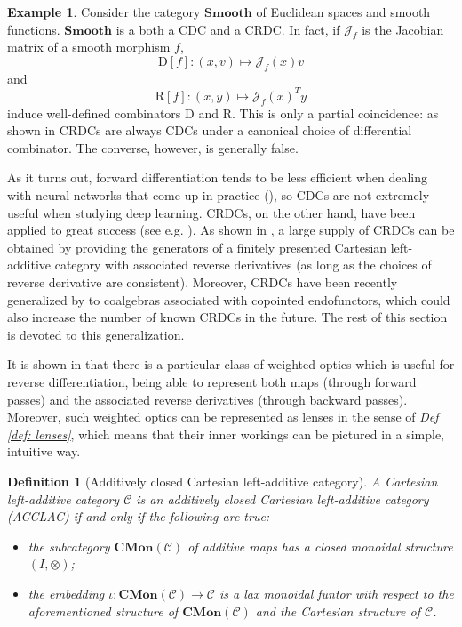 \documentclass[11pt,a4paper,openright,twoside]{report}
\newcounter{mycounter}
\theoremstyle{plain}
\newtheorem{definition}[mycounter]{Definition}
\theoremstyle{definition}
\newtheorem{example}[mycounter]{Example}
\begin{document}
\begin{example}
  \label{ex: smooth}
  Consider the category $\mathbf{Smooth}$ of Euclidean spaces and smooth functions.
  $\mathbf{Smooth}$ is a both a CDC and a CRDC. In fact, if $\mathcal{J}_f$ is the Jacobian matrix of a smooth morphism $f$,
  \[\mathrm{D}[f]: (x,v) \mapsto \mathcal{J}_f(x)v\]
  and
  \[\mathrm{R}[f]: (x,y) \mapsto \mathcal{J}_f(x)^Ty\]
  induce well-defined combinators $\mathrm{D}$ and $\mathrm{R}$. This is only a partial coincidence: as shown in \cite{cockett2019reverse} CRDCs are always CDCs under a canonical choice of differential combinator. The converse, however, is generally false.
\end{example}

As it turns out, forward differentiation tends to be less efficient when dealing with neural networks that come up in practice (\cite{elliott2018simple}), so CDCs are not extremely useful when studying deep learning. CRDCs, on the other hand, have been applied to great success (see e.g. \cite{cruttwell2022categorical}). As shown in \cite{wilson2022categories}, a large supply of CRDCs can be obtained by providing the generators of a finitely presented Cartesian left-additive category with associated reverse derivatives (as long as the choices of reverse derivative are consistent).
Moreover, CRDCs have been recently generalized by \cite{gavranovic2024fundamental} to coalgebras associated with copointed endofunctors, which could also increase the number of known CRDCs in the future. The rest of this section is devoted to this generalization.

It is shown in \cite{gavranovic2024fundamental} that there is a particular class of weighted optics which is useful for reverse differentiation, being able to represent both maps (through forward passes) and the associated reverse derivatives (through backward passes). Moreover, such weighted optics can be represented as lenses in the sense of \textit{Def \ref{def: lenses}}, which means that their inner workings can be pictured in a simple, intuitive way.

\begin{definition}[Additively closed Cartesian left-additive category]
  A Cartesian left-additive category $\mathcal{C}$ is an additively closed Cartesian left-additive category (ACCLAC) if and only if the following are true:
  \begin{itemize}
    \item the subcategory $\mathbf{CMon}(\mathcal{C})$ of additive maps has a closed monoidal structure $(I, \otimes)$;
    \item the embedding $\iota: \mathbf{CMon}(\mathcal{C}) \to \mathcal{C}$ is a lax monoidal funtor with respect to the aforementioned structure of $\mathbf{CMon}(\mathcal{C})$ and the Cartesian structure of $\mathcal{C}$.
  \end{itemize}
\end{definition}
\end{document}
